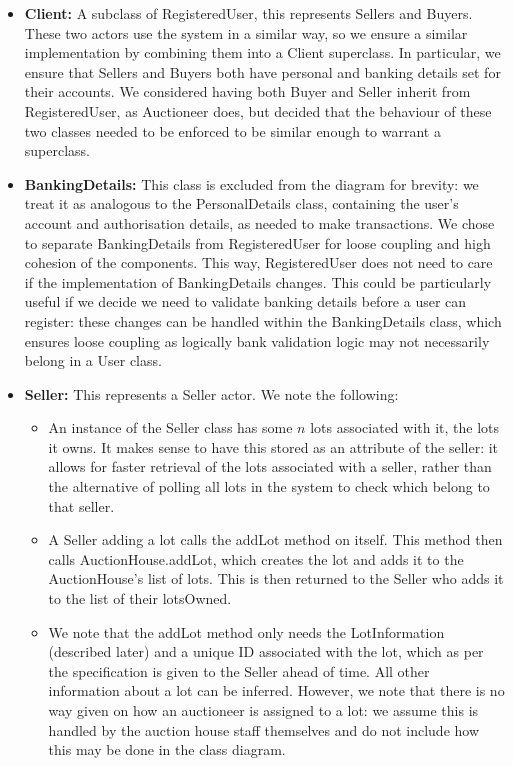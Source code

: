 \documentclass[titlepage, 12pt]{extarticle}
\begin{document}
\begin{itemize}
\item {\bf Client: } A subclass of RegisteredUser, this represents Sellers and Buyers. These two actors use the system in a similar way, so we ensure a similar implementation by combining them into a Client superclass. In particular, we ensure that Sellers and Buyers both have personal and banking details set for their accounts. We considered having both Buyer and Seller inherit from RegisteredUser, as Auctioneer does, but decided that the behaviour of these two classes needed to be enforced to be similar enough to warrant a superclass. 
\item {\bf BankingDetails: } This class is excluded from the diagram for brevity: we treat it as analogous to the PersonalDetails class, containing the user's account and authorisation details, as needed to make transactions. We chose to separate BankingDetails from RegisteredUser for loose coupling and high cohesion of the components. This way, RegisteredUser does not need to care if the implementation of BankingDetails changes. This could be particularly useful if we decide we need to validate banking details before a user can register: these changes can be handled within the BankingDetails class, which ensures loose coupling as logically bank validation logic may not necessarily belong in a User class. 
\item {\bf Seller: } This represents a Seller actor. We note the following:
  \begin{itemize}
  \item An instance of the Seller class has some $n$ lots associated with it, the lots it owns. It makes sense to have this stored as an attribute of the seller: it allows for faster retrieval of the lots associated with a seller, rather than the alternative of polling all lots in the system to check which belong to that seller. 
  \item A Seller adding a lot calls the addLot method on itself. This method then calls AuctionHouse.addLot, which creates the lot and adds it to the AuctionHouse's list of lots. This is then returned to the Seller who adds it to the list of their lotsOwned.
  \item We note that the addLot method only needs the LotInformation (described later) and a unique ID associated with the lot, which as per the specification is given to the Seller ahead of time. All other information about a lot can be inferred. However, we note that there is no way given on how an auctioneer is assigned to a lot: we assume this is handled by the auction house staff themselves and do not include how this may be done in the class diagram.

\end{itemize}
\end{itemize}
\end{document}
